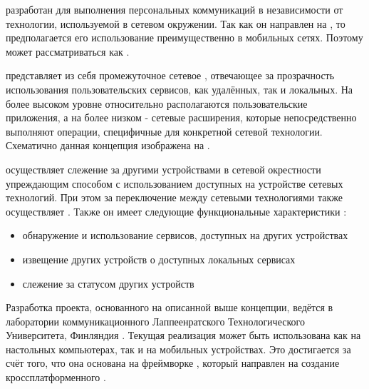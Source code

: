 \Sentence
\PeerHood разработан для выполнения персональных коммуникаций в независимости от технологии, 
используемой в сетевом окружении.
\Sentence
Так как он направлен на , то предполагается его использование 
преимущественно в мобильных сетях.
\Sentence
Поэтому \PeerHood может рассматриваться как  
.

\Sentence
\PeerHood представляет из себя промежуточное сетевое , отвечающее за 
прозрачность использования пользовательских сервисов, как удалённых, так и локальных.
\Sentence
На более высоком уровне относительно \PeerHood располагаются пользовательские приложения, а на 
более низком - сетевые расширения, которые непосредственно выполняют операции, специфичные для 
конкретной сетевой технологии.
\Sentence
Схематично данная концепция изображена на .


\Sentence
\PeerHood осуществляет слежение за другими устройствами в сетевой окрестности упреждающим способом 
с использованием доступных на устройстве сетевых технологий.
\Sentence
При этом за переключение между сетевыми технологиями также осуществляет \PeerHood.
\Sentence
Также он имеет следующие функциональные характеристики :
\begin{itemize}
	\item обнаружение и использование сервисов, доступных на других устройствах
	\item извещение других устройств о доступных локальных сервисах
	\item слежение за статусом других устройств
\end{itemize}

\Sentence
Разработка проекта, основанного на описанной выше концепции, ведётся в лаборатории 
коммуникационного  Лаппеенратского Технологического Университета, 
Финляндия .
\Sentence
Текущая реализация \PeerHood может быть использована как на настольных компьютерах, так и на 
мобильных устройствах. 
\Sentence
Это достигается за счёт того, что она основана на фреймворке  
, который направлен на создание кроссплатформенного .
